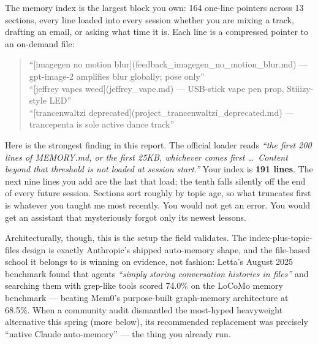 \documentclass[11pt,letterpaper]{article}
\newenvironment{excerpt}{%
  \par\vspace{0.5em}%
  \begin{quote}\small\color{acdark}%
}{%
  \end{quote}\vspace{0.3em}\par%
}
\begin{document}
The memory index is the largest block you own: 164 one-line pointers across 13 sections, every line loaded into every session whether you are mixing a track, drafting an email, or asking what time it is. Each line is a compressed pointer to an on-demand file:

\begin{excerpt}
``[imagegen no motion blur](feedback\_imagegen\_no\_motion\_blur.md) --- gpt-image-2 amplifies blur globally; pose only''\\[0.3em]
``[jeffrey vapes weed](jeffrey\_vape.md) --- USB-stick vape pen prop, Stiiizy-style LED''\\[0.3em]
``[trancenwaltzi deprecated](project\_trancenwaltzi\_deprecated.md) --- trancepenta is sole active dance track''
\end{excerpt}

Here is the strongest finding in this report. The official loader reads \textit{``the first 200 lines of MEMORY.md, or the first 25KB, whichever comes first \ldots\ Content beyond that threshold is not loaded at session start.''} Your index is \textbf{191 lines}. The next nine lines you add are the last that load; the tenth falls silently off the end of every future session. Sections sort roughly by topic age, so what truncates first is whatever you taught me most recently. You would not get an error. You would get an assistant that mysteriously forgot only its newest lessons.

Architecturally, though, this is the setup the field validates. The index-plus-topic-files design is exactly Anthropic's shipped auto-memory shape, and the file-based school it belongs to is winning on evidence, not fashion: Letta's August 2025 benchmark found that agents \textit{``simply storing conversation histories in files''} and searching them with grep-like tools scored 74.0\% on the LoCoMo memory benchmark --- beating Mem0's purpose-built graph-memory architecture at 68.5\%. When a community audit dismantled the most-hyped heavyweight alternative this spring (more below), its recommended replacement was precisely ``native Claude auto-memory'' --- the thing you already run.
\end{document}

